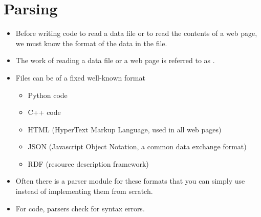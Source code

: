 \documentclass[letterpaper,10pt,english]{sphinxmanual}
\begin{document}
\section{Parsing}
\label{\detokenize{lecture_notes/lec13_files_web:parsing}}\begin{itemize}
\item {} 
Before writing code to read a data file or to read the contents of a
web page, we must know the format of the data in the file.

\item {} 
The work of reading a data file or a web page is referred to as
.

\item {} 
Files can be of a fixed well-known format
\begin{itemize}
\item {} 
Python code

\item {} 
C++ code

\item {} 
HTML (HyperText Markup Language, used in all web pages)

\item {} 
JSON (Javascript Object Notation, a common data exchange format)

\item {} 
RDF (resource description framework)

\end{itemize}

\item {} 
Often there is a parser module for these formats that you can
simply use instead of implementing them from scratch.

\item {} 
For code, parsers check for syntax errors.

\end{itemize}
\end{document}
